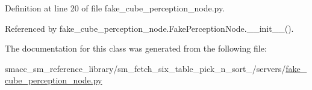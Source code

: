 Definition at line 20 of file fake\+\_\+cube\+\_\+perception\+\_\+node.\+py.



Referenced by fake\+\_\+cube\+\_\+perception\+\_\+node.\+Fake\+Perception\+Node.\+\_\+\+\_\+init\+\_\+\+\_\+().



The documentation for this class was generated from the following file\+:\begin{DoxyCompactItemize}
\item 
smacc\+\_\+sm\+\_\+reference\+\_\+library/sm\+\_\+fetch\+\_\+six\+\_\+table\+\_\+pick\+\_\+n\+\_\+sort\+\_/servers/\hyperlink{sm__fetch__six__table__pick__n__sort__1_2servers_2fake__cube__perception__node_8py}{fake\+\_\+cube\+\_\+perception\+\_\+node.\+py}\end{DoxyCompactItemize}
